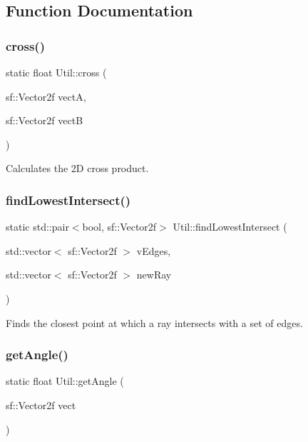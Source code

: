 \subsection{Function Documentation}
\mbox{\label{namespace_util_aa9cb7802e25081651b64f1f701f7541c}} 
\subsubsection{\texorpdfstring{cross()}{cross()}}
{\footnotesize\ttfamily static float Util\+::cross (\begin{DoxyParamCaption}\item[{sf\+::\+Vector2f}]{vectA,  }\item[{sf\+::\+Vector2f}]{vectB }\end{DoxyParamCaption})\hspace{0.3cm}{\ttfamily [static]}}



Calculates the 2D cross product. 

\mbox{\label{namespace_util_a0b6b9c5da48af75235e92300dbce08d0}} 
\subsubsection{\texorpdfstring{find\+Lowest\+Intersect()}{findLowestIntersect()}}
{\footnotesize\ttfamily static std\+::pair$<$bool, sf\+::\+Vector2f$>$ Util\+::find\+Lowest\+Intersect (\begin{DoxyParamCaption}\item[{std\+::vector$<$ sf\+::\+Vector2f $>$}]{v\+Edges,  }\item[{std\+::vector$<$ sf\+::\+Vector2f $>$}]{new\+Ray }\end{DoxyParamCaption})\hspace{0.3cm}{\ttfamily [static]}}



Finds the closest point at which a ray intersects with a set of edges. 

\mbox{\label{namespace_util_a4388b22d564bbf04e68473256c2b3100}} 
\subsubsection{\texorpdfstring{get\+Angle()}{getAngle()}}
{\footnotesize\ttfamily static float Util\+::get\+Angle (\begin{DoxyParamCaption}\item[{sf\+::\+Vector2f}]{vect }\end{DoxyParamCaption})\hspace{0.3cm}{\ttfamily [static]}}



